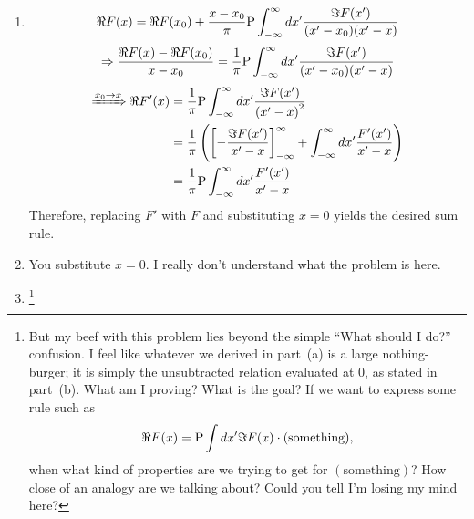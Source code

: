 \item

\begin{enumerate}[wide, labelindent = 0pt, label = (\alph*)]
\item
\[
    \Re F(x)
    = \Re F(x_0)
    + \frac{x - x_0}{\pi} \mathrm{P}\int_{-\infty}^\infty dx' \frac{\Im F(x')}{(x' - x_0)(x' - x)}
\]
\[
    \Rightarrow \frac{\Re F(x) - \Re F(x_0)}{x - x_0}
    = \frac{1}{\pi} \mathrm{P}\int_{-\infty}^\infty dx' \frac{\Im F(x')}{(x' - x_0)(x' - x)}
\]
\begin{align*}
    \xRightarrow{x_0 \rightarrow x} \Re F'(x)
    &= \inv{\pi} \Pint_{-\infty}^\infty dx' \frac{\Im F(x')}{{(x' - x)}^2} \\
    &= \inv{\pi} \left(
        \diffBetween{-\frac{\Im F(x')}{x' - x}}{-\infty}{\infty}
        + \int_{-\infty}^\infty dx' \frac{F'(x')}{x' - x}
    \right) \\
    &= \inv{\pi} \Pint_{-\infty}^\infty dx' \frac{F'(x')}{x' - x}
\end{align*}
Therefore, replacing $F'$ with $F$ and substituting $x = 0$ yields the desired sum rule.

\item
You substitute $x = 0$.
I really don't understand what the problem is here.

\item
\notyet\footnote{%
But my beef with this problem lies beyond the simple ``What should I do?'' confusion.
I feel like whatever we derived in part~(a) is a large nothing-burger;
it is simply the unsubtracted relation evaluated at $0$, as stated in part~(b).
What am I proving? What is the goal?
If we want to express some rule such as
\[
    \Re F(x) = \mathrm{P}\int dx' \Im F(x) \cdot (\text{something}),
\]
when what kind of properties are we trying to get for $(\text{something})$?
How close of an analogy are we talking about?
Could you tell I'm losing my mind here?
}

\end{enumerate}
